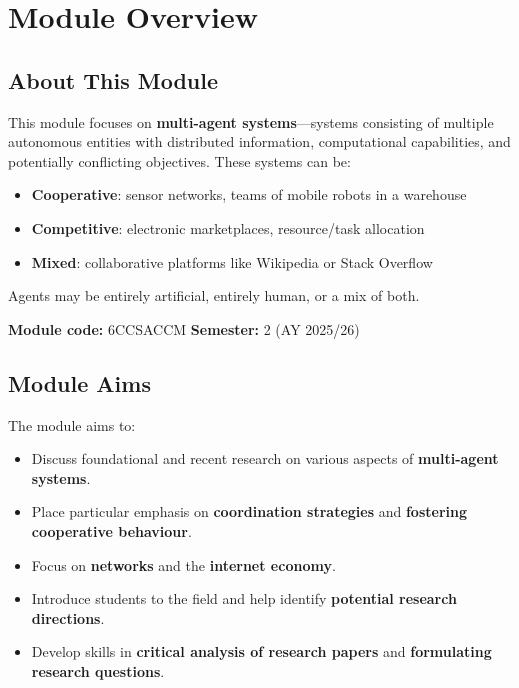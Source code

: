 \section*{Module Overview}

\subsection*{About This Module}

This module focuses on \textbf{multi-agent systems}---systems consisting of multiple autonomous entities with distributed information, computational capabilities, and potentially conflicting objectives. These systems can be:

\begin{itemize}
  \item \textbf{Cooperative}: sensor networks, teams of mobile robots in a warehouse
  \item \textbf{Competitive}: electronic marketplaces, resource/task allocation
  \item \textbf{Mixed}: collaborative platforms like Wikipedia or Stack Overflow
\end{itemize}

Agents may be entirely artificial, entirely human, or a mix of both.

\textbf{Module code:} 6CCSACCM \hfill \textbf{Semester:} 2 (AY 2025/26)

\bigseparator

\subsection*{Module Aims}

The module aims to:
\begin{itemize}
  \item Discuss foundational and recent research on various aspects of \textbf{multi-agent systems}.
  \item Place particular emphasis on \textbf{coordination strategies} and \textbf{fostering cooperative behaviour}.
  \item Focus on \textbf{networks} and the \textbf{internet economy}.
  \item Introduce students to the field and help identify \textbf{potential research directions}.
  \item Develop skills in \textbf{critical analysis of research papers} and \textbf{formulating research questions}.
\end{itemize}

